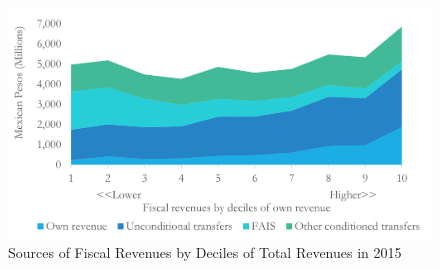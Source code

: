 \documentclass[dv_diss_main.tex]{subfiles}
\begin{document}
\begin{figure}[H] 
	\centering 
	
	\includegraphics[width=\linewidth]{figures/Descriptives_2.png}
	\caption{Sources of Fiscal Revenues by Deciles of Total Revenues in 2015}\label{fig:des4}

\parbox{\textwidth}{\small 
	\vspace{2eX}
	\footnotesize
	\revenuebydecil 
}
	
\end{figure}
\end{document}
